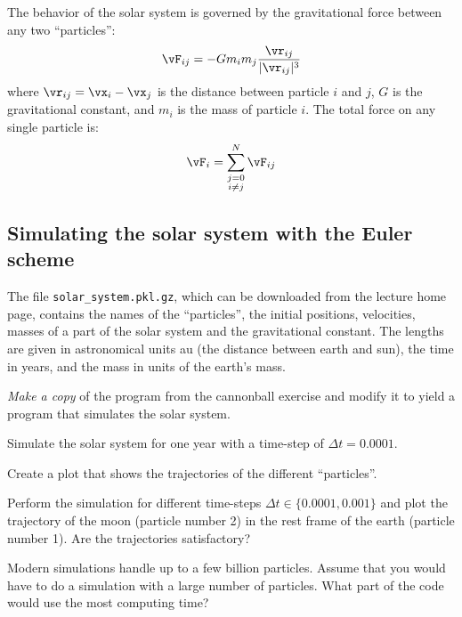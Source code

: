 The behavior of the solar system is governed by the gravitational force between
any two ``particles'':
  \begin{equation}
    \vF_{ij} = - G m_i m_j \frac{\vr_{ij}}{|\vr_{ij}|^3}
  \end{equation}
where $\vr_{ij} = \vx_i - \vx_j$ is the distance between particle $i$ and $j$,
$G$ is the gravitational constant, and $m_i$ is the mass of particle $i$. 
The total force on any single particle is:
  \begin{equation}
    \vF_i = \sum_{\substack{j=0\\i \ne j}}^N \vF_{ij}
    \label{eq:gravitation}
  \end{equation}

\subsection{Simulating the solar system with the Euler scheme}

The file \verb!solar_system.pkl.gz!, which can be downloaded from the lecture
home page, contains the names of the ``particles'', the initial positions,
velocities, masses  of a part of the solar system and the gravitational
constant.
The lengths are given in astronomical units \unit{au} (\ie the distance
between earth and sun), the time in years, and the mass in units of the earth's
mass.

\begin{task}[4]
  \begin{compactitem}
      \item \emph{Make a copy} of the program from the cannonball exercise and
        modify it to yield a program that simulates the solar system.
      \item Simulate the solar system for one year with a time-step of $\Delta
        t = 0.0001$.
      \item Create a plot that shows the trajectories of the different
        ``particles''.
      \item Perform the simulation for different time-steps $\Delta t \in
        \{0.0001, 0.001\}$ and plot the trajectory of the moon (particle number
        2) in the rest frame of the earth (particle number 1). 
        Are the trajectories satisfactory?
      \item Modern simulations handle up to a few billion particles.  Assume
        that you would have to do a simulation with a large number of
        particles.
        What part of the code would use the most computing time?
  \end{compactitem}
\end{task}

